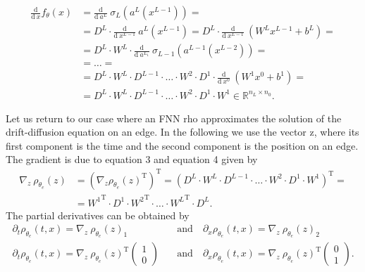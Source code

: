 \begin{align*}
    \frac{\mathrm{d}}{\mathrm{d} \ x} f_{\theta}(x) & = \frac{\mathrm{d}}{\mathrm{d} \ a^{L}} \ \sigma_{L} (a^{L}(x^{L-1})) = \\
    & = D^L \cdot \frac{\mathrm{d}}{\mathrm{d} \ x^{L-1}} \ a^{L}(x^{L-1}) = D^L \cdot \frac{\mathrm{d}}{\mathrm{d} \ x^{L-1}} \ (W^{L} x^{L-1} + b^{L}) = \\
    & = D^L \cdot W^L \cdot \frac{\mathrm{d}}{\mathrm{d} \ a^{L_1}} \ \sigma_{L-1} (a^{L-1}(x^{L-2})) = \\
    & = \ldots = \\
    & = D^L \cdot W^L \cdot D^{L-1} \cdot \ldots \cdot W^2 \cdot D^1 \cdot \frac{\mathrm{d}}{\mathrm{d} \ x^{0}} \ (W^{1} x^{0} + b^{1}) = \\
    & = D^L \cdot W^L \cdot D^{L-1} \cdot \ldots \cdot W^2 \cdot D^1 \cdot W^{1} \in \mathbb{R}^{n_L \times n_0}.
\end{align*}

Let us return to our case where an FNN rho approximates the solution of the drift-diffusion equation on an edge. In the following we use the vector z, where its first component is the time and the second component is the position on an edge. The gradient is due to equation 3 and equation 4 given by 
\begin{equation}
    \begin{split}
        \nabla_{z}  \ \rho_{\theta_e}(z) & = \left(\nabla_{z} \rho_{\theta_e}(z)^{\mathrm{T}} \right)^{\mathrm{T}} = \left(D^L \cdot W^L \cdot D^{L-1} \cdot \ldots \cdot W^2 \cdot D^1 \cdot W^{1} \right)^{\mathrm{T}} = \\
        & = {W^{1}}^{\mathrm{T}} \cdot D^{1} \cdot {W^{2}}^{\mathrm{T}} \cdot \ldots \cdot {W^{L}}^{\mathrm{T}}  \cdot  D^{L}. 
    \end{split}
\end{equation}
The partial derivatives can be obtained by 
\begin{equation*}
    \begin{split}
        \partial_t \rho_{\theta_e}(t,x) = \nabla_{z} \ \rho_{\theta_e}(z)_1 \quad & \text{and} \quad \partial_x \rho_{\theta_e}(t,x) = \nabla_{z} \ \rho_{\theta_e}(z)_2 \\
        \partial_t \rho_{\theta_e}(t,x) = {\nabla_{z} \ \rho_{\theta_e}(z)}^{\mathrm{T}} \begin{pmatrix} 1 \\ 0 \end{pmatrix} \quad & \text{and} \quad \partial_x \rho_{\theta_e}(t,x) = {\nabla_{z} \ \rho_{\theta_e}(z)}^{\mathrm{T}} \begin{pmatrix} 0 \\ 1 \end{pmatrix}.
    \end{split}
\end{equation*}


